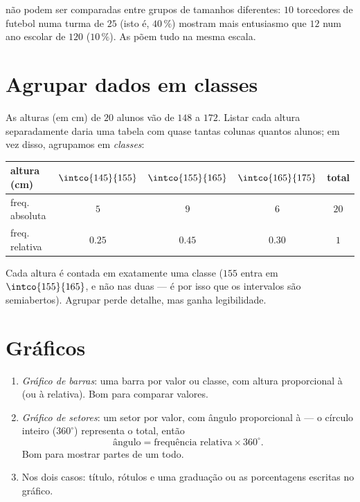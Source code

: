 \begin{remark}
 não podem ser comparadas entre grupos de tamanhos
diferentes: $10$ torcedores de futebol numa turma de $25$ (isto é,
$40\,\%$) mostram mais entusiasmo que $12$ num ano escolar de $120$
($10\,\%$). As  põem tudo na mesma escala.
\end{remark}

\section{Agrupar dados em classes}

\begin{example}[Classes]\label{ex:g7:stats:classes}
As alturas (em cm) de $20$ alunos vão de $148$ a $172$. Listar cada
altura separadamente daria uma tabela com quase tantas colunas quantos
alunos; em vez disso, agrupamos em \emph{classes}:
\begin{center}
\renewcommand{\arraystretch}{1.3}
\begin{tabular}{l|ccc|c}
altura (cm) & $\intco{145}{155}$ & $\intco{155}{165}$ &
$\intco{165}{175}$ & total \\
\hline
freq. absoluta & $5$ & $9$ & $6$ & $20$ \\
freq. relativa & $0.25$ & $0.45$ & $0.30$ & $1$ \\
\end{tabular}
\end{center}
Cada altura é contada em exatamente uma classe ($155$ entra em
$\intco{155}{165}$, e não nas duas --- é por isso que os intervalos são
semiabertos). Agrupar perde detalhe, mas ganha legibilidade.
\end{example}

\section{Gráficos}

\begin{method}\label{met:g7:stats:charts}
\begin{enumerate}
  \item \emph{Gráfico de barras}: uma barra por valor ou classe, com
        altura proporcional à  (ou à relativa). Bom
        para comparar valores.
  \item \emph{Gráfico de setores}: um setor por valor, com ângulo
        proporcional à  --- o círculo inteiro
        ($360^\circ$) representa o total, então
        \[
        \text{ângulo} = \text{frequência relativa} \times 360^\circ .
        \]
        Bom para mostrar partes de um todo.
  \item Nos dois casos: título, rótulos e uma graduação ou as
        porcentagens escritas no gráfico.
\end{enumerate}
\end{method}

